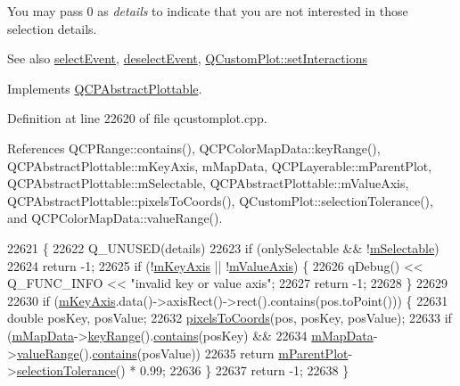 You may pass 0 as {\itshape details} to indicate that you are not interested in those selection details.

\begin{DoxySeeAlso}{See also}
\hyperlink{class_q_c_p_abstract_plottable_a16aaad02456aa23a759efd1ac90c79bf}{select\+Event}, \hyperlink{class_q_c_p_abstract_plottable_a6fa0d0f95560ea8b01ee13f296dab2b1}{deselect\+Event}, \hyperlink{class_q_custom_plot_a5ee1e2f6ae27419deca53e75907c27e5}{Q\+Custom\+Plot\+::set\+Interactions} 
\end{DoxySeeAlso}


Implements \hyperlink{class_q_c_p_abstract_plottable_a38efe9641d972992a3d44204bc80ec1d}{Q\+C\+P\+Abstract\+Plottable}.



Definition at line 22620 of file qcustomplot.\+cpp.



References Q\+C\+P\+Range\+::contains(), Q\+C\+P\+Color\+Map\+Data\+::key\+Range(), Q\+C\+P\+Abstract\+Plottable\+::m\+Key\+Axis, m\+Map\+Data, Q\+C\+P\+Layerable\+::m\+Parent\+Plot, Q\+C\+P\+Abstract\+Plottable\+::m\+Selectable, Q\+C\+P\+Abstract\+Plottable\+::m\+Value\+Axis, Q\+C\+P\+Abstract\+Plottable\+::pixels\+To\+Coords(), Q\+Custom\+Plot\+::selection\+Tolerance(), and Q\+C\+P\+Color\+Map\+Data\+::value\+Range().


\begin{DoxyCode}
22621                                                         \{
22622   Q\_UNUSED(details)
22623   if (onlySelectable && !\hyperlink{class_q_c_p_abstract_plottable_aceee52342c8e75727abcbd164986fdcb}{mSelectable})
22624     return -1;
22625   if (!\hyperlink{class_q_c_p_abstract_plottable_a426f42e254d0f8ce5436a868c61a6827}{mKeyAxis} || !\hyperlink{class_q_c_p_abstract_plottable_a2901452ca4aea911a1827717934a4bda}{mValueAxis}) \{
22626     qDebug() << Q\_FUNC\_INFO << \textcolor{stringliteral}{"invalid key or value axis"};
22627     \textcolor{keywordflow}{return} -1;
22628   \}
22629 
22630   \textcolor{keywordflow}{if} (\hyperlink{class_q_c_p_abstract_plottable_a426f42e254d0f8ce5436a868c61a6827}{mKeyAxis}.data()->axisRect()->rect().contains(pos.toPoint())) \{
22631     \textcolor{keywordtype}{double} posKey, posValue;
22632     \hyperlink{class_q_c_p_abstract_plottable_a10408828446e9e0681c46d65120f382e}{pixelsToCoords}(pos, posKey, posValue);
22633     \textcolor{keywordflow}{if} (\hyperlink{class_q_c_p_color_map_a8709272aa8f0be3ca111bf3866806f8b}{mMapData}->\hyperlink{class_q_c_p_color_map_data_a4765180639742460f64ab6c97c745c08}{keyRange}().\hyperlink{class_q_c_p_range_a030ce95b527c32e01414d0351347b46d}{contains}(posKey) &&
22634         \hyperlink{class_q_c_p_color_map_a8709272aa8f0be3ca111bf3866806f8b}{mMapData}->\hyperlink{class_q_c_p_color_map_data_a025be4d7ba0494fd7b38a5a56c737f2a}{valueRange}().\hyperlink{class_q_c_p_range_a030ce95b527c32e01414d0351347b46d}{contains}(posValue))
22635       \textcolor{keywordflow}{return} \hyperlink{class_q_c_p_layerable_aa2a528433e44db02b8aef23c1f9f90ed}{mParentPlot}->\hyperlink{class_q_custom_plot_a7b738074c75e80070ef6a10263c6cd69}{selectionTolerance}() * 0.99;
22636   \}
22637   \textcolor{keywordflow}{return} -1;
22638 \}
\end{DoxyCode}


